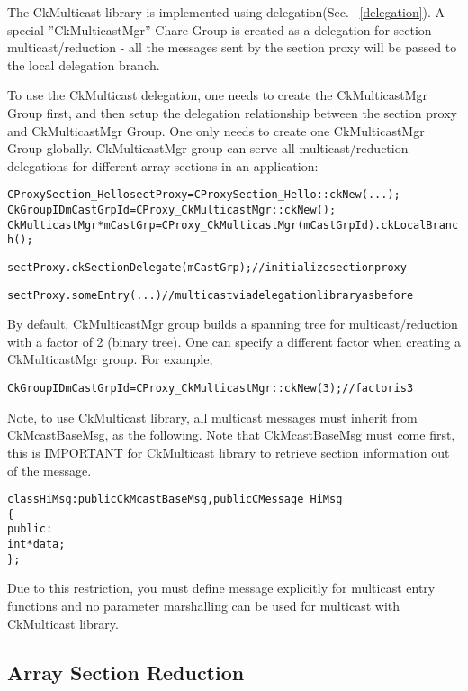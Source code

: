 The CkMulticast library is implemented using delegation(Sec. ~\ref{delegation}). 
A special ''CkMulticastMgr'' Chare Group is created as a 
delegation for section multicast/reduction - all the messages sent
by the section proxy will be passed to the local delegation branch.

To use the CkMulticast delegation, one needs to create the CkMulticastMgr Group 
first, and then setup the delegation relationship between the section proxy and 
CkMulticastMgr Group. 
One only needs to create one CkMulticastMgr Group globally.
CkMulticastMgr group can serve all multicast/reduction delegations
for different array sections in an application:

\begin{alltt}
  CProxySection_Hello sectProxy = CProxySection_Hello::ckNew(...);
  CkGroupID mCastGrpId = CProxy_CkMulticastMgr::ckNew();
  CkMulticastMgr *mCastGrp = CProxy_CkMulticastMgr(mCastGrpId).ckLocalBranch();

  sectProxy.ckSectionDelegate(mCastGrp);  // initialize section proxy

  sectProxy.someEntry(...)           //multicast via delegation library as before
\end{alltt}

By default, CkMulticastMgr group builds a spanning tree for multicast/reduction
with a factor of 2 (binary tree).
One can specify a different factor when creating a CkMulticastMgr group.
For example,

\begin{alltt}
  CkGroupID mCastGrpId = CProxy_CkMulticastMgr::ckNew(3);   // factor is 3
\end{alltt}

Note, to use CkMulticast library, all multicast messages must inherit from 
CkMcastBaseMsg, as the following.
Note that CkMcastBaseMsg must come first, this is IMPORTANT for CkMulticast 
library to retrieve section information out of the message.


\begin{alltt}
class HiMsg : public CkMcastBaseMsg, public CMessage_HiMsg
\{
public:
  int *data;
\};
\end{alltt}

Due to this restriction, you must define message explicitly for multicast 
entry functions and no parameter marshalling can be used for multicast with 
CkMulticast library.

\subsection{Array Section Reduction} 

